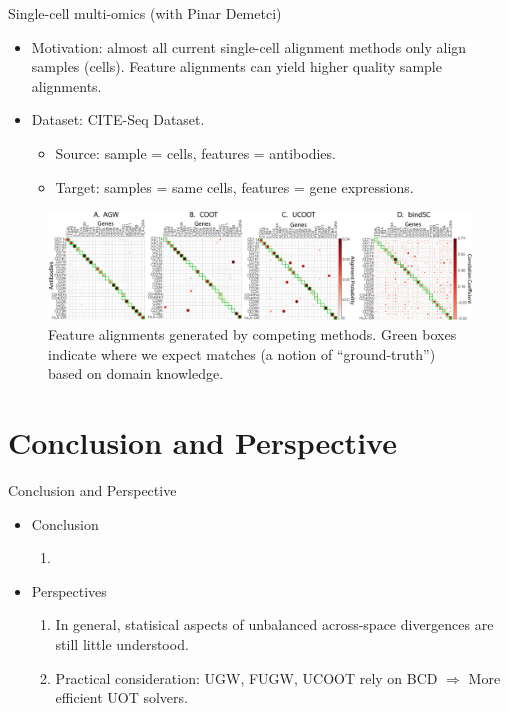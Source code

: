 \documentclass{beamer}
\begin{document}
\begin{frame}{Single-cell multi-omics (with Pinar Demetci)}
\scriptsize
\begin{itemize}
  \item Motivation: almost all current single-cell alignment methods only
  align samples (cells). Feature alignments can yield higher quality
  sample alignments.
  \item Dataset: CITE-Seq Dataset.
  \begin{itemize}
    \scriptsize
    \item Source: sample = cells, features = antibodies.
    \item Target: samples = same cells, features = gene expressions.
  \end{itemize}
\end{itemize}
\begin{figure}
  \centering
  \includegraphics[width=1.\linewidth, keepaspectratio=true]{OT_new/cite_fgcoot_final.pdf}
  \caption*{\scriptsize{Feature alignments generated by competing methods.
  Green boxes indicate where we expect matches (a notion of “ground-truth”)
  based on domain knowledge.}}
\end{figure}
\end{frame}

\section{Conclusion and Perspective}
\begin{frame}{Conclusion and Perspective}
\scriptsize
\begin{itemize}
  \item Conclusion
  \begin{enumerate}
    \item
  \end{enumerate}

  \item Perspectives
  \begin{enumerate}
    \scriptsize
    \item In general, statisical aspects of unbalanced across-space divergences
    are still little understood.
    \item Practical consideration: UGW, FUGW, UCOOT rely on BCD
    $\Rightarrow$ More efficient UOT solvers.
  \end{enumerate}
\end{itemize}
\end{frame}
\end{document}
